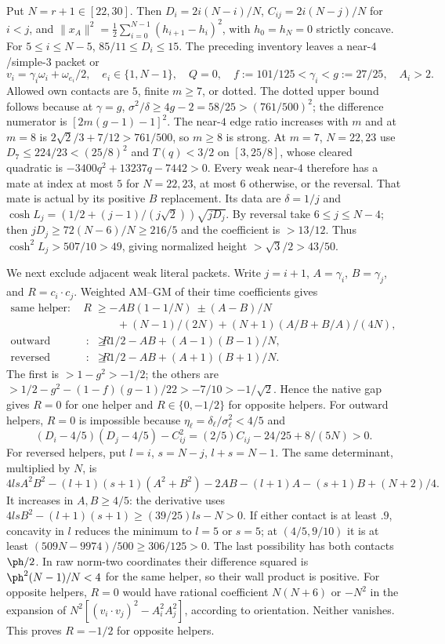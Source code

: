 Put $N=r+1\in[22,30]$. Then
$D_i=2i(N-i)/N$, $C_{ij}=2i(N-j)/N$ for $i<j$, and
$\|x_A\|^2=\frac12\sum_{i=0}^{N-1}(h_{i+1}-h_i)^2$,
with $h_0=h_N=0$ strictly concave.
For $5\le i\le N-5$, $85/11\le D_i\le15$.
The preceding inventory leaves a near-$4$/simple-$3$ packet or
\begin{equation}\label{app:tail:eq:Aweakpacket}
 v_i=\gamma_i\omega_i+\omega_{e_i}/2,\quad
 e_i\in\{1,N-1\},\quad Q=0,\quad
 f:=101/125<\gamma_i<g:=27/25,\quad A_i>2.
\end{equation}
Allowed own contacts are $5$, finite $m\ge7$, or dotted.
The dotted upper bound follows because at $\gamma=g$,
$\sigma^2/\delta\ge4g-2=58/25>(761/500)^2$;
the difference numerator is $[2m(g-1)-1]^2$.
The near-$4$ edge ratio increases with $m$ and at $m=8$ is
$2\sqrt2/3+7/12>761/500$, so $m\ge8$ is strong.
At $m=7$, $N=22,23$ use
$D_7\le224/23<(25/8)^2$ and $T(q)<3/2$ on $[3,25/8]$,
whose cleared quadratic is $-3400q^2+13237q-7442>0$.
Every weak near-$4$ therefore has a mate at index at most $5$
for $N=22,23$, at most $6$ otherwise, or the reversal.
That mate is actual by its positive $B$ replacement. Its data are
$\delta=1/j$ and
$\cosh L_j=(1/2+(j-1)/(j\sqrt2))\sqrt{jD_j}$.
By reversal take $6\le j\le N-4$; then
$jD_j\ge72(N-6)/N\ge216/5$ and the coefficient is $>13/12$.
Thus $\cosh^2L_j>507/10>49$, giving normalized height
$>\sqrt3/2>43/50$.

We next exclude adjacent weak literal packets. Write $j=i+1$,
$A=\gamma_i$, $B=\gamma_j$, and $R=c_i\cdot c_j$.
Weighted AM--GM of their time coefficients gives
\[
\begin{aligned}
\text{same helper}:\quad R&\ge-AB(1-1/N)\ \pm(A-B)/N\\
 &\qquad +(N-1)/(2N)+(N+1)(A/B+B/A)/(4N),\\
\text{outward helpers}:\quad R&\ge1/2-AB+(A-1)(B-1)/N,\\
\text{reversed helpers}:\quad R&\ge1/2-AB+(A+1)(B+1)/N.
\end{aligned}
\]
The first is $>1-g^2>-1/2$; the others are
$>1/2-g^2-(1-f)(g-1)/22>-7/10>-1/\sqrt2$.
Hence the native gap gives $R=0$ for one helper and
$R\in\{0,-1/2\}$ for opposite helpers.
For outward helpers, $R=0$ is impossible because
$\eta_\ell=\delta_\ell/\sigma_\ell^2<4/5$ and
\[
 (D_i-4/5)(D_j-4/5)-C_{ij}^2
       =(2/5)C_{ij}-24/25+8/(5N)>0.
\]
For reversed helpers, put $l=i$, $s=N-j$, $l+s=N-1$.
The same determinant, multiplied by $N$, is
\[
 4lsA^2B^2-(l+1)(s+1)(A^2+B^2)-2AB
 -(l+1)A-(s+1)B+(N+2)/4.
\]
It increases in $A,B\ge4/5$: the derivative uses
$4lsB^2-(l+1)(s+1)\ge(39/25)ls-N>0$.
If either contact is at least $.9$, concavity in $l$ reduces the
minimum to $l=5$ or $s=5$; at $(4/5,9/10)$ it is at least
$(509N-9974)/500\ge306/125>0$.
The last possibility has both contacts $\ph/2$.
In raw norm-two coordinates their difference squared is
$\ph^2(N-1)/N<4$ for the same helper, so their wall product is
positive. For opposite helpers, $R=0$ would have rational coefficient
$N(N+6)$ or $-N^2$ in the expansion of
$N^2[(v_i\cdot v_j)^2-A_i^2A_j^2]$, according to orientation.
Neither vanishes. This proves $R=-1/2$ for opposite helpers.

